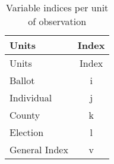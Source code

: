\documentclass[12pt,twoside]{reedthesis}
\begin{document}
  \begin{longtable}[]{@{}lc@{}}
  \caption{Variable indices per unit of observation
  \label{tab:units_vars}}\tabularnewline
  \toprule
  \begin{minipage}[b]{0.27\columnwidth}\raggedright\strut
  Units\strut
  \end{minipage} & \begin{minipage}[b]{0.16\columnwidth}\centering\strut
  Index\strut
  \end{minipage}\tabularnewline
  \midrule
  \endfirsthead
  \toprule
  \begin{minipage}[b]{0.27\columnwidth}\raggedright\strut
  Units\strut
  \end{minipage} & \begin{minipage}[b]{0.16\columnwidth}\centering\strut
  Index\strut
  \end{minipage}\tabularnewline
  \midrule
  \endhead
  \begin{minipage}[t]{0.27\columnwidth}\raggedright\strut
  Ballot\strut
  \end{minipage} & \begin{minipage}[t]{0.16\columnwidth}\centering\strut
  i\strut
  \end{minipage}\tabularnewline
  \begin{minipage}[t]{0.27\columnwidth}\raggedright\strut
  Individual\strut
  \end{minipage} & \begin{minipage}[t]{0.16\columnwidth}\centering\strut
  j\strut
  \end{minipage}\tabularnewline
  \begin{minipage}[t]{0.27\columnwidth}\raggedright\strut
  County\strut
  \end{minipage} & \begin{minipage}[t]{0.16\columnwidth}\centering\strut
  k\strut
  \end{minipage}\tabularnewline
  \begin{minipage}[t]{0.27\columnwidth}\raggedright\strut
  Election\strut
  \end{minipage} & \begin{minipage}[t]{0.16\columnwidth}\centering\strut
  l\strut
  \end{minipage}\tabularnewline
  \begin{minipage}[t]{0.27\columnwidth}\raggedright\strut
  General Index\strut
  \end{minipage} & \begin{minipage}[t]{0.16\columnwidth}\centering\strut
  v\strut
  \end{minipage}\tabularnewline
  \bottomrule
  \end{longtable}
  
\end{document}
